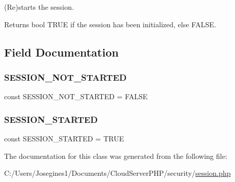 (Re)starts the session.

\begin{DoxyReturn}{Returns}
bool T\+R\+UE if the session has been initialized, else F\+A\+L\+SE. 
\end{DoxyReturn}


\subsection{Field Documentation}
\mbox{\label{class_session_a94b9c32892bf9caa605c3ed51a60e2f1}} 
\subsubsection{\texorpdfstring{S\+E\+S\+S\+I\+O\+N\+\_\+\+N\+O\+T\+\_\+\+S\+T\+A\+R\+T\+ED}{SESSION\_NOT\_STARTED}}
{\footnotesize\ttfamily const S\+E\+S\+S\+I\+O\+N\+\_\+\+N\+O\+T\+\_\+\+S\+T\+A\+R\+T\+ED = F\+A\+L\+SE}

\mbox{\label{class_session_aeb8c4b9d65462d40a3aa64f0bcbb7921}} 
\subsubsection{\texorpdfstring{S\+E\+S\+S\+I\+O\+N\+\_\+\+S\+T\+A\+R\+T\+ED}{SESSION\_STARTED}}
{\footnotesize\ttfamily const S\+E\+S\+S\+I\+O\+N\+\_\+\+S\+T\+A\+R\+T\+ED = T\+R\+UE}



The documentation for this class was generated from the following file\+:\begin{DoxyCompactItemize}
\item 
C\+:/\+Users/\+Josegines1/\+Documents/\+Cloud\+Server\+P\+H\+P/security/\mbox{\hyperlink{session_8php}{session.\+php}}\end{DoxyCompactItemize}
